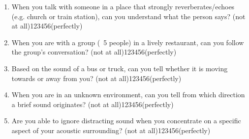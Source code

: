 \documentclass[12pt, a4paper]{article}
\begin{document}
\begin{enumerate}
\item  When you talk with someone in a place that strongly reverberates/echoes (e.g. church or train station), can you understand what the person says?
\newline (not at all)\hspace{12pt}1\hspace{12pt}2\hspace{12pt}3\hspace{12pt}4\hspace{12pt}5\hspace{12pt}6\hspace{12pt}(perfectly) 
\item  When you are with a group (~5 people) in a lively restaurant, can you follow the group's conversation?
\newline (not at all)\hspace{12pt}1\hspace{12pt}2\hspace{12pt}3\hspace{12pt}4\hspace{12pt}5\hspace{12pt}6\hspace{12pt}(perfectly)
\item  Based on the sound of a bus or truck, can you tell whether it is moving towards or away from you?
\newline (not at all)\hspace{12pt}1\hspace{12pt}2\hspace{12pt}3\hspace{12pt}4\hspace{12pt}5\hspace{12pt}6\hspace{12pt}(perfectly)
\item  When you are in an unknown environment, can you tell from which direction a brief sound originates?
\newline (not at all)\hspace{12pt}1\hspace{12pt}2\hspace{12pt}3\hspace{12pt}4\hspace{12pt}5\hspace{12pt}6\hspace{12pt}(perfectly)
\item Are you able to ignore distracting sound when you concentrate on a specific aspect of your acoustic surrounding?
\newline (not at all)\hspace{12pt}1\hspace{12pt}2\hspace{12pt}3\hspace{12pt}4\hspace{12pt}5\hspace{12pt}6\hspace{12pt}(perfectly)

\end{enumerate}
\end{document}
